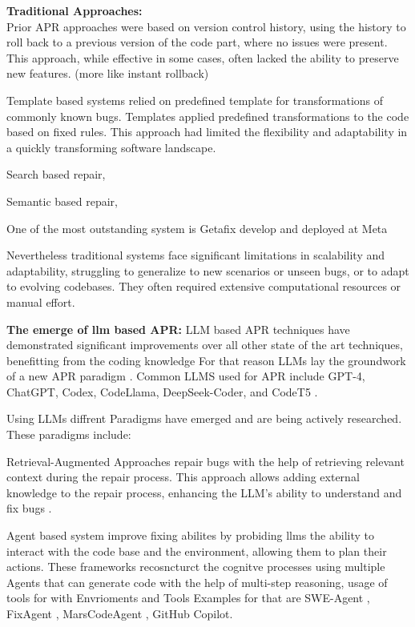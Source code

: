 \textbf{Traditional Approaches:}\\
Prior APR approaches were based on version control history, using the history to roll back to a previous version of the code part, where no issues were present. This approach, while effective in some cases, often lacked the ability to preserve new features. (more like instant rollback)

Template based systems relied on predefined template for transformations of commonly known bugs. Templates applied predefined transformations to the code based on fixed rules. This approach had limited the flexibility and adaptability in a quickly transforming software landscape. \cite{puvvadiCodingAgentsComprehensive2025}

Search based repair,

Semantic based repair,

One of the most outstanding system is Getafix develop and deployed at Meta \cite{baderGetafixLearningFix2019}

Nevertheless traditional systems face significant limitations in scalability and adaptability, struggling to generalize to new scenarios or unseen bugs, or to adapt to evolving codebases. They often required extensive computational resources or manual effort. \cite{puvvadiCodingAgentsComprehensive2025}


\textbf{The emerge of llm based APR:}
LLM based APR techniques have demonstrated significant improvements over all other state of the art techniques, benefitting from the coding knowledge \cite{hossainDeepDiveLarge2024}For that reason LLMs lay the groundwork of a new APR paradigm \cite{chenUnveilingPitfallsUnderstanding2025}.
Common LLMS used for APR include GPT-4, ChatGPT, Codex, CodeLlama, DeepSeek-Coder, and CodeT5 \cite{houLargeLanguageModels2024, yinThinkRepairSelfDirectedAutomated2024,anandComprehensiveSurveyAIDriven2024}.

Using LLMs diffrent Paradigms have emerged and are being actively researched. These paradigms include:

Retrieval-Augmented Approaches repair bugs with the help of retrieving relevant context during the repair process. This approach allows adding external knowledge to the repair process, enhancing the LLM's ability to understand and fix bugs \cite{houLargeLanguageModels2024, yinThinkRepairSelfDirectedAutomated2024}.

Agent based system improve fixing abilites by probiding llms the ability to interact with the code base and the environment, allowing them to plan their actions. These frameworks recosncturct the cognitve processes using multiple Agents that can generate code with the help of multi-step reasoning, usage of tools for  with Envrioments and Tools %
Examples for that are SWE-Agent \cite{yangSWEagentAgentComputerInterfaces2024}, FixAgent \cite{leeUnifiedDebuggingApproach2024}, MarsCodeAgent \cite{liuMarsCodeAgentAInative2024}, GitHub Copilot.

